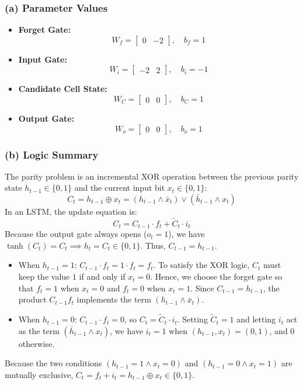 \documentclass[11pt,english]{article}
\begin{document}
\begin{enumerate}[resume]
\subsubsection*{(a) Parameter Values}
\begin{itemize}
    \item \textbf{Forget Gate:}
    \[
    W_f = \begin{bmatrix} 0 & -2 \end{bmatrix}, \quad b_f = 1
    \]
    \item \textbf{Input Gate:}
    \[
    W_i = \begin{bmatrix} -2 & 2 \end{bmatrix}, \quad b_i = -1
    \]
    \item \textbf{Candidate Cell State:}
    \[
    W_C = \begin{bmatrix} 0 & 0 \end{bmatrix}, \quad b_C = 1
    \]
    \item \textbf{Output Gate:}
    \[
    W_o = \begin{bmatrix} 0 & 0 \end{bmatrix}, \quad b_o = 1
    \]
\end{itemize}


\newpage
\subsubsection*{(b) Logic Summary}
The parity problem is an incremental XOR operation between the previous parity state $h_{t-1} \in \{0, 1\}$ and the current input bit $x_t \in \{0, 1\}$:
\[
C_t = h_{t-1} \oplus x_t = (h_{t-1} \land \bar{x}_t) \lor (\bar{h}_{t-1} \land x_t)
\]
In an LSTM, the update equation is:
\[
C_t = C_{t-1} \cdot f_t + \tilde{C}_t \cdot i_t
\]
Because the output gate always opens ($o_t = 1$), we have $\tanh(C_t) = C_t \implies h_t = C_t \in \{0, 1\}$. Thus, $C_{t-1} = h_{t-1}$. 
\begin{itemize}
    \item When $h_{t-1} = 1$: $C_{t-1} \cdot f_t = 1 \cdot f_t = f_t$. To satisfy the XOR logic, $C_t$ must keep the value $1$ if and only if $x_t = 0$. Hence, we choose the forget gate so that \(f_t=1\) when \(x_t=0\) and \(f_t=0\) when \(x_t=1\). Since \(C_{t-1}=h_{t-1}\), the product \(C_{t-1}f_t\) implements the term \((h_{t-1}\land\bar{x}_t)\).
    \item When $h_{t-1} = 0$: $C_{t-1} \cdot f_t = 0$, so $C_t = \tilde{C}_t \cdot i_t$. Setting $\tilde{C}_t = 1$ and letting $i_t$ act as the term $(\bar{h}_{t-1} \land x_t)$, we have $i_t = 1$ when $(h_{t-1}, x_t) = (0, 1)$, and $0$ otherwise.
\end{itemize}
Because the two conditions $(h_{t-1}=1 \land x_t=0)$ and $(h_{t-1}=0 \land x_t=1)$ are mutually exclusive, $C_t = f_t + i_t = h_{t-1} \oplus x_t \in \{0, 1\}$.


\end{enumerate}
\end{document}
